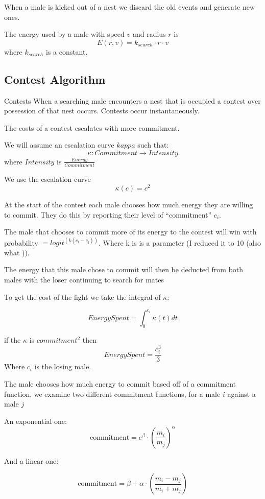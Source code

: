 \documentclass[a4paper,11pt]{article}
\begin{document}
When a male is kicked out of a nest we discard the old events and generate new ones.

The energy used by a male with speed $v$ and radius $r$ is 
\begin{equation}
    E(r,v) = k_{search} \cdot r \cdot v
\end{equation}
where $k_{search}$ is a constant.


\clearpage
\subsection{Contest Algorithm}
Contests 
When a searching male encounters a nest that is occupied a contest over possession of that nest occurs. Contests occur instantaneously. 

The costs of a contest escalates with more commitment.

We will assume an escalation curve $kappa$ such that:
$$\kappa : Commitment \rightarrow Intensity$$
where $Intensity$ is $\frac{Energy}{Commitment}$

We use the escalation curve $$ \kappa (c) = c^2 $$

At the start of the contest each male chooses how much  energy they are willing to commit.
They do this by reporting their level of ``commitment'' $c_i$.

The male that chooses to commit more of its energy to the contest will win with probability $= logit^(k(c_i - c_j))$. Where k is is a parameter (I reduced it to 10 (also what )). 

The energy that this male chose to commit will then be deducted from both males with the loser continuing to search for mates

To get the cost of the fight we take the integral of $\kappa$:

$$Energy Spent = \int_0^{c_i}{\kappa(t)}dt$$

if the $\kappa$ is $commitment^2$ then
$$EnergySpent = \frac{c_i^3}{3}$$
Where $c_i$ is the losing male.


The male chooses how much energy to commit based off of a commitment function, we examine two different commitment functions, for a male $i$ against a male $j$

An exponential one:
$$\mathrm{commitment} = e^\beta \cdot (\frac{m_i}{m_j})^\alpha $$

And a linear one:

$$\mathrm{commitment} = \beta + \alpha \cdot (\frac{m_i - m_j}{m_i + m_j})$$
\end{document}
